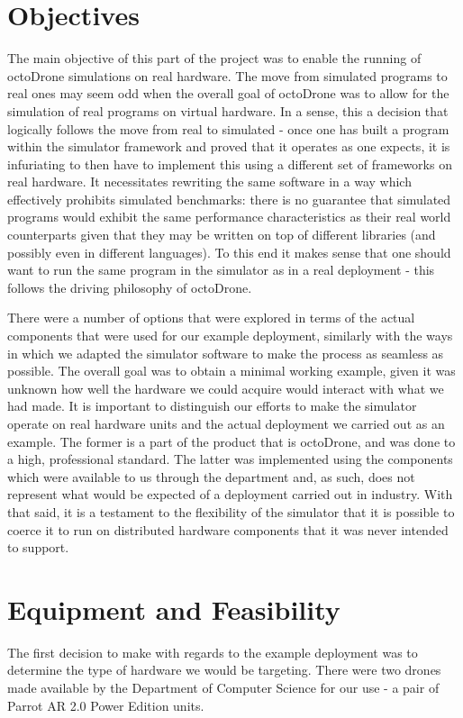 \section{Objectives}
The main objective of this part of the project was to enable the running of octoDrone simulations on real hardware. The move from simulated programs to real ones may seem odd when the overall goal of octoDrone was to allow for the simulation of real programs on virtual hardware. In a sense, this a decision that logically follows the move from real to simulated - once one has built a program within the simulator framework and proved that it operates as one expects, it is infuriating to then have to implement this using a different set of frameworks on real hardware. It necessitates rewriting the same software in a way which effectively prohibits simulated benchmarks: there is no guarantee that simulated programs would exhibit the same performance characteristics as their real world counterparts given that they may be written on top of different libraries (and possibly even in different languages). To this end it makes sense that one should want to run the same program in the simulator as in a real deployment - this follows the driving philosophy of octoDrone.

There were a number of options that were explored in terms of the actual components that were used for our example deployment, similarly with the ways in which we adapted the simulator software to make the process as seamless as possible. The overall goal was to obtain a minimal working example, given it was unknown how well the hardware we could acquire would interact with what we had made. It is important to distinguish our efforts to make the simulator operate on real hardware units and the actual deployment we carried out as an example. The former is a part of the product that is octoDrone, and was done to a high, professional standard. The latter was implemented using the components which were available to us through the department and, as such, does not represent what would be expected of a deployment carried out in industry. With that said, it is a testament to the flexibility of the simulator that it is possible to coerce it to run on distributed hardware components that it was never intended to support.

\section{Equipment and Feasibility}
The first decision to make with regards to the example deployment was to determine the type of hardware we would be targeting. There were two drones made available by the Department of Computer Science for our use - a pair of Parrot AR 2.0 Power Edition units.

